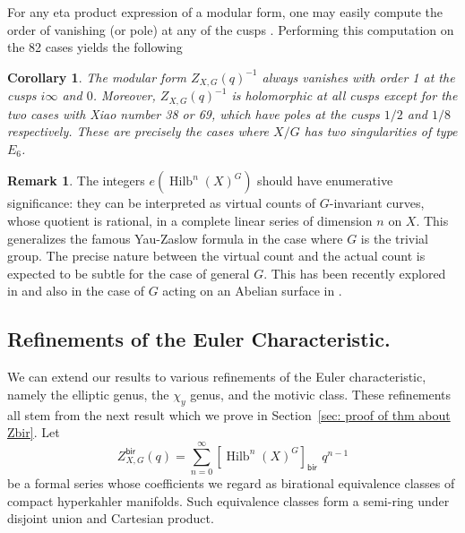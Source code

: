 \documentclass{amsart}
\newtheorem{corollary}[theorem]{Corollary}
\theoremstyle{definition}
\newtheorem{remark}[theorem]{Remark}
\newcommand{\bir}{\mathsf{bir}}
\newcommand{\Hilb}{\operatorname{Hilb}}
\begin{document}
For any eta product expression of a modular form, one may easily
compute the order of vanishing (or pole) at any of the cusps
\cite[Cor~2.2]{kohler2011eta}. Performing this computation on the 82
cases yields the following

\begin{corollary}\label{cor: vanishing at cusps}
The modular form $Z_{X,G}(q)^{-1}$ always vanishes with order 1 at the cusps
$i\infty$ and $0$. Moreover,
$Z_{X,G}(q)^{-1}$ is holomorphic at all cusps except for the two cases with
Xiao number 38 or 69, which have poles at the cusps $1/2$ and $1/8$
respectively. These are precisely the cases where $X/G$ has two
singularities of type $E_{6}$.
\end{corollary}

\begin{remark}\label{rem: enumerative interpretation}
The integers $e\left(\Hilb^{n}(X)^{G} \right)$ should have enumerative
significance: they can be interpreted as virtual counts of
$G$-invariant curves, whose quotient is rational, in a complete linear
series of dimension $n$ on $X$. This generalizes the famous Yau-Zaslow
formula \cite{Yau-Zaslow} in the case where $G$ is the trivial
group. The precise nature between the virtual count and the actual
count is expected to be subtle for the case of general $G$. This has
been recently explored in \cite{Zhan-2019-counting-curves-on-K3} and
also in the case of $G$ acting on an Abelian surface in
\cite{Pietromonaco-GHilbA}.
\end{remark}


\subsection{Refinements of the Euler Characteristic.}
We can extend our results to various refinements of the Euler
characteristic, namely the elliptic genus, the $\chi_{y}$ genus, and
the motivic class. These refinements all stem from the next
result which we prove in Section~\ref{sec: proof of thm about Zbir}. Let 
\[
Z^{\bir}_{X,G}(q) = \sum_{n=0}^{\infty} [\Hilb^{n}(X)^{G}]_{\bir} \,
\, q^{n-1}
\]
be a formal series whose coefficients we regard as birational
equivalence classes of compact hyperkahler manifolds. Such equivalence
classes form a semi-ring under disjoint union and Cartesian
product.
\end{document}
